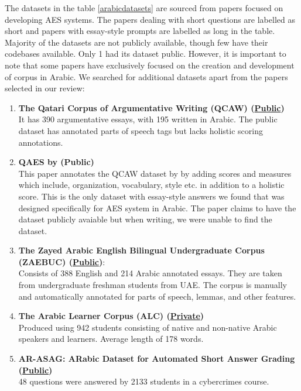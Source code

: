 \documentclass{article}
\begin{document}
\newpage
\restoregeometry
The datasets in the table \ref{arabicdatasets} are sourced from papers focused on developing AES  systems. The papers dealing with short questions are labelled as short and papers with essay-style prompts are labelled as long in the table. Majority of the datasets are not publicly available, though few have their codebases available. Only 1 had its dataset public. 
However, it is important to note that some papers have exclusively focused on the creation and development of corpus in Arabic. We searched for additional datasets apart from the papers selected in our review:
\begin{enumerate}
    \item \textbf{The Qatari Corpus of Argumentative Writing (QCAW)  \cite{zaghouani2024qcaw} (\href{https://catalog.ldc.upenn.edu/LDC2022T04}{Public})} \\ It has 390 argumentative essays, with 195 written in Arabic. The public dataset has annotated parts of speech tags but lacks holistic scoring annotations.
    \item \textbf{QAES by \textcite{21_bashendy2024qaes} (Public)} \\ This paper annotates the QCAW dataset by \textcite{zaghouani2024qcaw} by adding scores and measures which include, organization, vocabulary, style etc. in addition to a holistic score. This is the only dataset with essay-style answers we found that was designed specifically for AES system in Arabic. The paper claims to have the dataset publicly avaiable but when writing, we were unable to find the dataset.
    \item \textbf{The Zayed Arabic English Bilingual Undergraduate Corpus (ZAEBUC) \cite{habash2022zaebuc} (\href{https://sites.google.com/view/zaebuc/home} {Public})}:  \\ 
    Consists of 388 English and 214 Arabic annotated essays. They are taken from undergraduate freshman students from UAE. The corpus is manually and automatically annotated for parts of speech, lemmas, and other features.
    \item \textbf{The Arabic Learner Corpus (ALC) (\href{https://www.arabiclearnercorpus.com/}{Private})} \\ Produced using 942 students consisting of native and non-native Arabic speakers and learners. Average length of 178 words.
    \item \textbf{AR-ASAG: ARabic Dataset for Automated Short Answer Grading \cite{ouahrani2020ar-asag} (\href{https://github.com/leilaouahrani/AR-ASAG-Dataset}{Public})} \\ 48 questions were answered by 2133 students in a cybercrimes course.

\end{enumerate}
\end{document}
